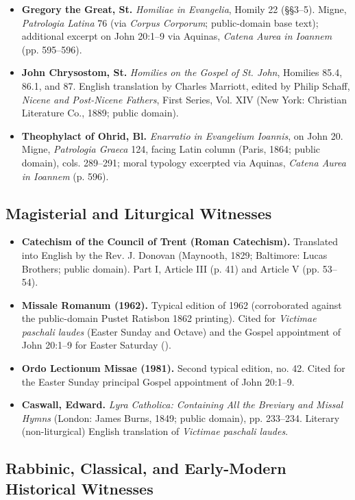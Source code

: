 \begin{itemize}
\item \textbf{Gregory the Great, St.} \emph{Homiliae in Evangelia}, Homily 22 (\S\S 3--5). Migne, \emph{Patrologia Latina} 76 (via \emph{Corpus Corporum}; public-domain base text); additional excerpt on John 20:1--9 via Aquinas, \emph{Catena Aurea in Ioannem} (pp. 595--596).
\item \textbf{John Chrysostom, St.} \emph{Homilies on the Gospel of St. John}, Homilies 85.4, 86.1, and 87. English translation by Charles Marriott, edited by Philip Schaff, \emph{Nicene and Post-Nicene Fathers}, First Series, Vol. XIV (New York: Christian Literature Co., 1889; public domain).
\item \textbf{Theophylact of Ohrid, Bl.} \emph{Enarratio in Evangelium Ioannis}, on John 20. Migne, \emph{Patrologia Graeca} 124, facing Latin column (Paris, 1864; public domain), cols. 289--291; moral typology excerpted via Aquinas, \emph{Catena Aurea in Ioannem} (p. 596).
\end{itemize}

\subsection{Magisterial and Liturgical Witnesses}

\begin{itemize}
\item \textbf{Catechism of the Council of Trent (Roman Catechism).} Translated into English by the Rev. J. Donovan (Maynooth, 1829; Baltimore: Lucas Brothers; public domain). Part I, Article III (p. 41) and Article V (pp. 53--54).
\item \textbf{Missale Romanum (1962).} Typical edition of 1962 (corroborated against the public-domain Pustet Ratisbon 1862 printing). Cited for \emph{Victimae paschali laudes} (Easter Sunday and Octave) and the Gospel appointment of John 20:1--9 for Easter Saturday ().
\item \textbf{Ordo Lectionum Missae (1981).} Second typical edition, no. 42. Cited for the Easter Sunday principal Gospel appointment of John 20:1--9.
\item \textbf{Caswall, Edward.} \emph{Lyra Catholica: Containing All the Breviary and Missal Hymns} (London: James Burns, 1849; public domain), pp. 233--234. Literary (non-liturgical) English translation of \emph{Victimae paschali laudes}.
\end{itemize}

\subsection{Rabbinic, Classical, and Early-Modern Historical Witnesses}


